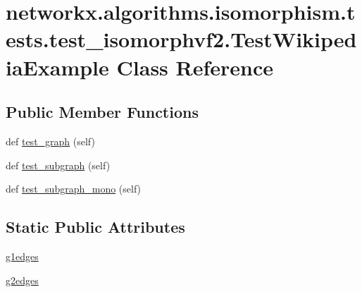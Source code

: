 \hypertarget{classnetworkx_1_1algorithms_1_1isomorphism_1_1tests_1_1test__isomorphvf2_1_1TestWikipediaExample}{}\section{networkx.\+algorithms.\+isomorphism.\+tests.\+test\+\_\+isomorphvf2.\+Test\+Wikipedia\+Example Class Reference}
\label{classnetworkx_1_1algorithms_1_1isomorphism_1_1tests_1_1test__isomorphvf2_1_1TestWikipediaExample}
\subsection*{Public Member Functions}
\begin{DoxyCompactItemize}
\item 
def \hyperlink{classnetworkx_1_1algorithms_1_1isomorphism_1_1tests_1_1test__isomorphvf2_1_1TestWikipediaExample_ac87e1834eaac790f24986bfbeecbc42b}{test\+\_\+graph} (self)
\item 
def \hyperlink{classnetworkx_1_1algorithms_1_1isomorphism_1_1tests_1_1test__isomorphvf2_1_1TestWikipediaExample_aa0bda8de36e2878af19e690b543ddcd7}{test\+\_\+subgraph} (self)
\item 
def \hyperlink{classnetworkx_1_1algorithms_1_1isomorphism_1_1tests_1_1test__isomorphvf2_1_1TestWikipediaExample_a87cb3619a2fbff6258a2746835223e6f}{test\+\_\+subgraph\+\_\+mono} (self)
\end{DoxyCompactItemize}
\subsection*{Static Public Attributes}
\begin{DoxyCompactItemize}
\item 
\hyperlink{classnetworkx_1_1algorithms_1_1isomorphism_1_1tests_1_1test__isomorphvf2_1_1TestWikipediaExample_a5a9b0dfcac1285317b457db880dafd92}{g1edges}
\item 
\hyperlink{classnetworkx_1_1algorithms_1_1isomorphism_1_1tests_1_1test__isomorphvf2_1_1TestWikipediaExample_a26204e9842bee88956070e1caf867e55}{g2edges}
\end{DoxyCompactItemize}


